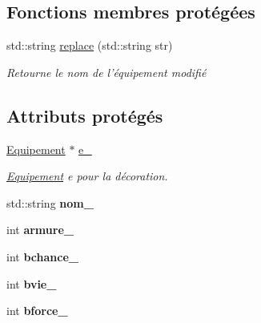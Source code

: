 \subsection*{Fonctions membres protégées}
\begin{DoxyCompactItemize}
\item 
std\-::string \hyperlink{class_d_equip_af8a7e83f36094af1f34f5c81df6e3900}{replace} (std\-::string str)
\begin{DoxyCompactList}\small\item\em Retourne le nom de l'équipement modifié \end{DoxyCompactList}\end{DoxyCompactItemize}
\subsection*{Attributs protégés}
\begin{DoxyCompactItemize}
\item 
\hypertarget{class_d_equip_a0243fb57df463a3d0a7c57e6e7980210}{\hyperlink{class_equipement}{Equipement} $\ast$ \hyperlink{class_d_equip_a0243fb57df463a3d0a7c57e6e7980210}{e\-\_\-}}\label{class_d_equip_a0243fb57df463a3d0a7c57e6e7980210}

\begin{DoxyCompactList}\small\item\em \hyperlink{class_equipement}{Equipement} e pour la décoration. \end{DoxyCompactList}\item 
\hypertarget{class_equipement_a930290aac01ecd40c7a646ab8f66d742}{std\-::string {\bfseries nom\-\_\-}}\label{class_equipement_a930290aac01ecd40c7a646ab8f66d742}

\item 
\hypertarget{class_equipement_a69339ce4f1f5fe7e6fcdeda5b74c14a4}{int {\bfseries armure\-\_\-}}\label{class_equipement_a69339ce4f1f5fe7e6fcdeda5b74c14a4}

\item 
\hypertarget{class_equipement_aa70effa6a8144fe1f4fe874af7139793}{int {\bfseries bchance\-\_\-}}\label{class_equipement_aa70effa6a8144fe1f4fe874af7139793}

\item 
\hypertarget{class_equipement_a73ac5bff40e3f6bf1d8e6f0e524e750f}{int {\bfseries bvie\-\_\-}}\label{class_equipement_a73ac5bff40e3f6bf1d8e6f0e524e750f}

\item 
\hypertarget{class_equipement_af87cf3f291386d5401be6994dd8fb8be}{int {\bfseries bforce\-\_\-}}\label{class_equipement_af87cf3f291386d5401be6994dd8fb8be}

\end{DoxyCompactItemize}


